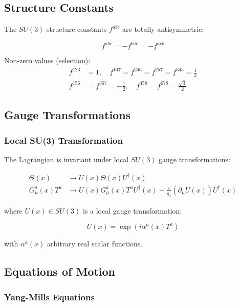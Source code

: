\subsection{Structure Constants}

The $SU(3)$ structure constants $f^{abc}$ are totally antisymmetric:

\begin{equation}
f^{abc} = -f^{bac} = -f^{acb}
\end{equation}

Non-zero values (selection):
\begin{align}
f^{123} &= 1, \quad f^{147} = f^{246} = f^{257} = f^{345} = \frac{1}{2} \\
f^{156} &= f^{367} = -\frac{1}{2}, \quad f^{458} = f^{678} = \frac{\sqrt{3}}{2}
\end{align}

\subsection{Gauge Transformations}

\subsubsection{Local SU(3) Transformation}

The Lagrangian is invariant under local $SU(3)$ gauge transformations:

\begin{align}
\Theta(x) &\to U(x) \Theta(x) U^\dagger(x) \label{eq:canonical:qcd_gauge_theta} \\
G^a_\mu(x) T^a &\to U(x) G^a_\mu(x) T^a U^\dagger(x) - \frac{i}{g_s}(\partial_\mu U(x)) U^\dagger(x) \label{eq:canonical:qcd_gauge_gluon}
\end{align}

where $U(x) \in SU(3)$ is a local gauge transformation:

\begin{equation}
U(x) = \exp\left(i\alpha^a(x) T^a\right)
\end{equation}

with $\alpha^a(x)$ arbitrary real scalar functions.

\subsection{Equations of Motion}

\subsubsection{Yang-Mills Equations}

